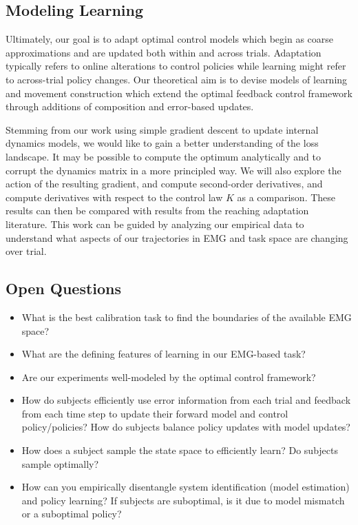 \documentclass[
  a4paper,
]{article}
\providecommand{\tightlist}{%
  \setlength{\itemsep}{0pt}\setlength{\parskip}{0pt}}
\begin{document}
\hypertarget{modeling-learning}{%
\subsection{Modeling Learning}\label{modeling-learning}}

Ultimately, our goal is to adapt optimal control models which begin as
coarse approximations and are updated both within and across trials.
Adaptation typically refers to online alterations to control policies
while learning might refer to across-trial policy changes. Our
theoretical aim is to devise models of learning and movement
construction which extend the optimal feedback control framework through
additions of composition and error-based updates.

Stemming from our work using simple gradient descent to update internal
dynamics models, we would like to gain a better understanding of the
loss landscape. It may be possible to compute the optimum analytically
and to corrupt the dynamics matrix in a more principled way. We will
also explore the action of the resulting gradient, and compute
second-order derivatives, and compute derivatives with respect to the
control law \(K\) as a comparison. These results can then be compared
with results from the reaching adaptation literature. This work can be
guided by analyzing our empirical data to understand what aspects of our
trajectories in EMG and task space are changing over trial.

\hypertarget{open-questions}{%
\subsection{Open Questions}\label{open-questions}}

\begin{itemize}
\tightlist
\item
  What is the best calibration task to find the boundaries of the
  available EMG space?
\item
  What are the defining features of learning in our EMG-based task?
\item
  Are our experiments well-modeled by the optimal control framework?
\item
  How do subjects efficiently use error information from each trial and
  feedback from each time step to update their forward model and control
  policy/policies? How do subjects balance policy updates with model
  updates?
\item
  How does a subject sample the state space to efficiently learn? Do
  subjects sample optimally?
\item
  How can you empirically disentangle system identification (model
  estimation) and policy learning? If subjects are suboptimal, is it due
  to model mismatch or a suboptimal policy?
\end{itemize}
\end{document}
